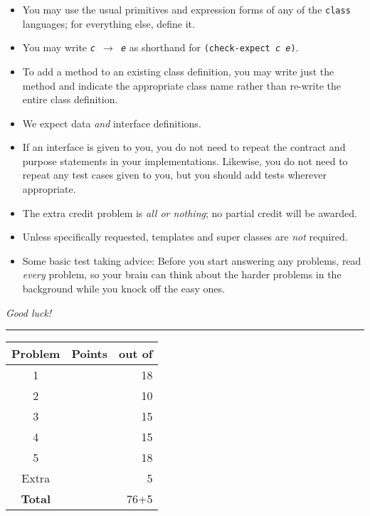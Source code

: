 \documentclass[12pt]{article}                   %
\newcommand\code[1]{\texttt{#1}}
\begin{document}
\noindent\begin{minipage}{8cm}\sloppy
\begin{itemize}
\item You may use the usual primitives and expression forms of any of
  the \code{class} languages; for everything else, define it.

\item You may write {\tt {\slshape c} $\rightarrow$ {\slshape e}} as
  shorthand for
  {\tt (check-expect {\slshape c e})}.

\item To add a method to an existing class definition, you
  may write just the method and indicate the appropriate class name
  rather than re-write the entire class definition.

\item We expect data \emph{and} interface definitions.

\item If an interface is given to you, you do not need to repeat the
  contract and purpose statements in your implementations.  Likewise,
  you do not need to repeat any test cases given to you, but you
  should add tests wherever appropriate.


\item The extra credit problem is \emph{all or nothing};  no partial
  credit will be awarded.

\item Unless specifically requested, templates and super classes are
  \emph{not} required.

\item Some basic test taking advice: Before you start answering
any problems, read \emph{every} problem, so your brain can  think
about the harder problems in the background while you knock off the easy ones.
\end{itemize}

\bigskip

\emph{Good luck!}
\end{minipage}\hfil\begin{minipage}[t]{6cm}
\rule{1cm}{0pt}\begin{tabular}{|c|l|@{/}r|}
\hline
{\bf Problem} & Points & out of \\ \hline
1 & & 18\\ \hline
2 & & 10\\ \hline
3 & & 15\\ \hline
4 & & 15\\ \hline
5 & & 18\\ \hline
Extra & & 5 \\ \hline
{\bf Total} & & 76+5 \\ \hline
\end{tabular}
\end{minipage}
\end{document}
